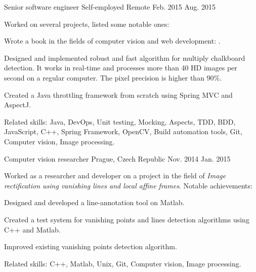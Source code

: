 \begin{cventries}
  \cventry
    {Senior software engineer} %
    {Self-employed} %
    {Remote} %
    {Feb. 2015 \textemdash{} Aug. 2015} %
    {    
    Worked on several projects, listed some notable ones:
      \begin{cvitems}
      \item{Wrote a book in the fields of computer vision and web development: .}
      \item{Designed and implemented robust and fast algorithm for multiply chalkboard detection. It works in real-time and processes more than 40 HD images per second on a regular computer. The pixel precision is higher than 90\%.}
      \item{Created a Java throttling framework from scratch using Spring MVC and AspectJ.}
      \end{cvitems}
      Related skills: Java, DevOps, Unit testing, Mocking, Aspects, TDD, BDD, JavaScript, C++, Spring Framework, OpenCV, Build automation tools, Git, Computer vision, Image processing.
    }
    
  \cventry
    {Computer vision researcher} %
    {} %
    {Prague, Czech Republic} %
    {Nov. 2014 \textemdash{} Jan. 2015} %
    {
	Worked as a researcher and developer on a project in the field of \textit{Image rectification using vanishing lines and local affine frames}. Notable achievements:
      \begin{cvitems}
      \item{Designed and developed a line-annotation tool on Matlab.}
      \item{Created a test system for vanishing points and lines detection algorithms using C++ and Matlab.}
      \item{Improved existing vanishing points detection algorithm.}
      \end{cvitems}
      Related skills: C++, Matlab, Unix, Git, Computer vision, Image processing.
    }
    

\end{cventries}
